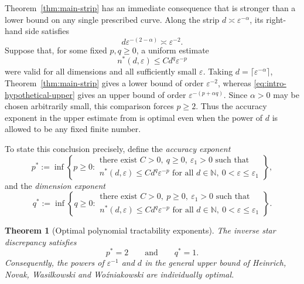 \documentclass[10pt,a4paper]{amsart}
\newtheorem{theorem}{Theorem}[section]
\newcommand{\1}{\mathbf{1}}
\newcommand{\N}{\mathbb{N}}
\begin{document}
Theorem~\ref{thm:main-strip} has an immediate consequence that is stronger than a lower bound on any single prescribed curve.  Along the strip \(d\asymp\varepsilon^{-\alpha}\), its right-hand side satisfies
\[
 d\varepsilon^{-(2-\alpha)}\asymp\varepsilon^{-2}.
\]
Suppose that, for some fixed \(p,q\ge0\), a uniform estimate
\begin{equation}\label{eq:intro-hypothetical-upper}
 n^{\ast}(d,\varepsilon)\le C d^q\varepsilon^{-p}
\end{equation}
were valid for all dimensions and all sufficiently small \(\varepsilon\).  Taking \(d=\lceil\varepsilon^{-\alpha}\rceil\), Theorem~\ref{thm:main-strip} gives a lower bound of order \(\varepsilon^{-2}\), whereas \eqref{eq:intro-hypothetical-upper} gives an upper bound of order \(\varepsilon^{-(p+\alpha q)}\).  Since \(\alpha>0\) may be chosen arbitrarily small, this comparison forces \(p\ge2\).  Thus the accuracy exponent in the upper estimate from \cite{HNWW01} is optimal even when the power of \(d\) is allowed to be any fixed finite number.



To state this conclusion precisely, define the \emph{accuracy exponent}
\begin{equation*}
 p^{\ast}
 :=
 \inf\left\{
 p\ge0:
 \begin{array}{l}
 \text{there exist }C>0,\ q\ge0,\ \varepsilon_1>0\text{ such that}\\
 n^{\ast}(d,\varepsilon)\le C d^q\varepsilon^{-p}
 \text{ for all }d\in\N,\ 0<\varepsilon\le\varepsilon_1
 \end{array}
 \right\},
\end{equation*}
and the \emph{dimension exponent}
\begin{equation*}
 q^{\ast}
 :=
 \inf\left\{
 q\ge0:
 \begin{array}{l}
 \text{there exist }C>0,\ p\ge0,\ \varepsilon_1>0\text{ such that}\\
 n^{\ast}(d,\varepsilon)\le C d^q\varepsilon^{-p}
 \text{ for all }d\in\N,\ 0<\varepsilon\le\varepsilon_1
 \end{array}
 \right\}.
\end{equation*}

\begin{theorem}[Optimal polynomial tractability exponents]\label{thm:tractability-exponents}
The inverse star discrepancy satisfies
\begin{equation*}
 p^{\ast}=2
 \qquad\text{and}\qquad
 q^{\ast}=1.
\end{equation*}
Consequently, the powers of \(\varepsilon^{-1}\) and \(d\) in the general upper bound of Heinrich, Novak, Wasilkowski and Wo\'{z}niakowski \cite{HNWW01} are individually optimal.
\end{theorem}
\end{document}
